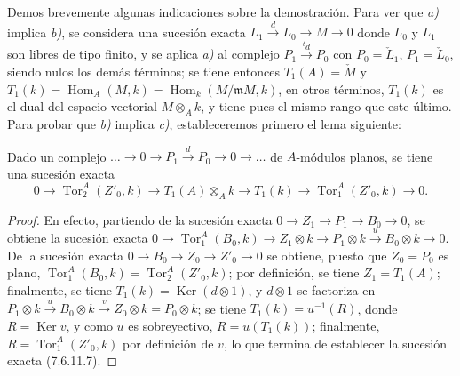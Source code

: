 \begin{remark}[7.6.11]
Demos brevemente algunas indicaciones sobre la demostración. Para ver que \emph{a)}
implica \emph{b)}, se considera una sucesión exacta
$L_1\xrightarrow{d}L_0\longrightarrow M\longrightarrow0$
donde $L_0$ y $L_1$ son libres de tipo finito, y se aplica \emph{a)} al complejo
$P_1\xrightarrow{{}^t d}P_0$ con $P_0=\check L_1$, $P_1=\check L_0$,
siendo nulos los demás términos; se tiene entonces $T_1(A)=\check M$ y
$T_1(k)=\operatorname{Hom}_A(M,k)=\operatorname{Hom}_k(M/\mathfrak mM,k)$,
en otros términos, $T_1(k)$ es el dual del espacio vectorial $M\otimes_A k$, y tiene
pues el mismo rango que este último. Para probar que \emph{b)} implica \emph{c)}, estableceremos
primero el lema siguiente:

\begin{lemma}[7.6.11.6]
Dado un complejo
$\ldots\longrightarrow0\longrightarrow P_1\xrightarrow{d}P_0\longrightarrow0\longrightarrow\ldots$
de $A$-módulos planos, se tiene una sucesión exacta
\[
  0\longrightarrow\operatorname{Tor}_2^A(Z'_0,k)
  \longrightarrow T_1(A)\otimes_A k
  \longrightarrow T_1(k)
  \longrightarrow\operatorname{Tor}_1^A(Z'_0,k)
  \longrightarrow0.
  \tag{7.6.11.7}\label{III.7.6.11.7.fr}
\]
\end{lemma}

\begin{proof}
En efecto, partiendo de la sucesión exacta
$0\to Z_1\to P_1\to B_0\to0$, se obtiene la sucesión exacta
$0\longrightarrow\operatorname{Tor}_1^A(B_0,k)\longrightarrow Z_1\otimes k\longrightarrow P_1\otimes k\xrightarrow{u}B_0\otimes k\longrightarrow0$.
De la sucesión exacta $0\to B_0\to Z_0\to Z'_0\to0$ se obtiene, puesto que $Z_0=P_0$
es plano,
$\operatorname{Tor}_1^A(B_0,k)=\operatorname{Tor}_2^A(Z'_0,k)$; por definición,
se tiene $Z_1=T_1(A)$; finalmente, se tiene $T_1(k)=\operatorname{Ker}(d\otimes1)$, y
$d\otimes1$ se factoriza en
$P_1\otimes k\xrightarrow{u}B_0\otimes k\xrightarrow{v}Z_0\otimes k=P_0\otimes k$;
se tiene $T_1(k)=u^{-1}(R)$, donde $R=\operatorname{Ker}v$, y como $u$ es
sobreyectivo, $R=u(T_1(k))$; finalmente,
$R=\operatorname{Tor}_1^A(Z'_0,k)$ por definición de $v$, lo que termina
de establecer la sucesión exacta (7.6.11.7).
\end{proof}


\end{remark}
